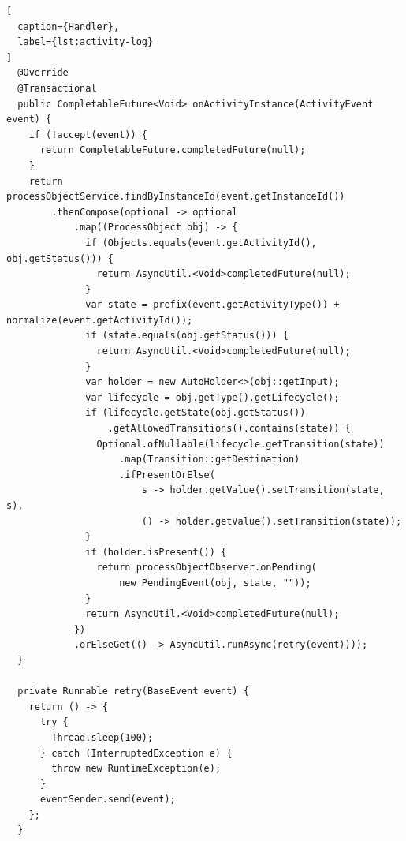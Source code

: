 \begin{lstlisting}[
  caption={Handler},
  label={lst:activity-log}
]
  @Override
  @Transactional
  public CompletableFuture<Void> onActivityInstance(ActivityEvent event) {
    if (!accept(event)) {
      return CompletableFuture.completedFuture(null);                          
    }
    return processObjectService.findByInstanceId(event.getInstanceId())        
        .thenCompose(optional -> optional
            .map((ProcessObject obj) -> {                                      
              if (Objects.equals(event.getActivityId(), obj.getStatus())) {
                return AsyncUtil.<Void>completedFuture(null);                  
              } 
              var state = prefix(event.getActivityType()) +                    
normalize(event.getActivityId());                                              
              if (state.equals(obj.getStatus())) {
                return AsyncUtil.<Void>completedFuture(null);                  
              } 
              var holder = new AutoHolder<>(obj::getInput);                    
              var lifecycle = obj.getType().getLifecycle();
              if (lifecycle.getState(obj.getStatus())                          
                  .getAllowedTransitions().contains(state)) {                  
                Optional.ofNullable(lifecycle.getTransition(state))            
                    .map(Transition::getDestination)                           
                    .ifPresentOrElse(
                        s -> holder.getValue().setTransition(state, s),        
                        () -> holder.getValue().setTransition(state));         
              }
              if (holder.isPresent()) {                                        
                return processObjectObserver.onPending(                        
                    new PendingEvent(obj, state, ""));
              }                                                                
              return AsyncUtil.<Void>completedFuture(null);
            })                                                                 
            .orElseGet(() -> AsyncUtil.runAsync(retry(event))));
  }

  private Runnable retry(BaseEvent event) {                                    
    return () -> {
      try {                                                                    
        Thread.sleep(100);
      } catch (InterruptedException e) {
        throw new RuntimeException(e);
      }                                                                        
      eventSender.send(event);
    };                                                                         
  }             


\end{lstlisting}

